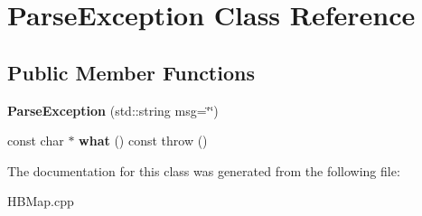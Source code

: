 \hypertarget{class_parse_exception}{\section{Parse\-Exception Class Reference}
\label{class_parse_exception}
}
\subsection*{Public Member Functions}
\begin{DoxyCompactItemize}
\item 
\hypertarget{class_parse_exception_ae42a372f3acb960331402fcca1808b52}{{\bfseries Parse\-Exception} (std\-::string msg=\char`\"{}\char`\"{})}\label{class_parse_exception_ae42a372f3acb960331402fcca1808b52}

\item 
\hypertarget{class_parse_exception_a3325238091196c8b7b48475734850f83}{const char $\ast$ {\bfseries what} () const   throw ()}\label{class_parse_exception_a3325238091196c8b7b48475734850f83}

\end{DoxyCompactItemize}


The documentation for this class was generated from the following file\-:\begin{DoxyCompactItemize}
\item 
H\-B\-Map.\-cpp\end{DoxyCompactItemize}
